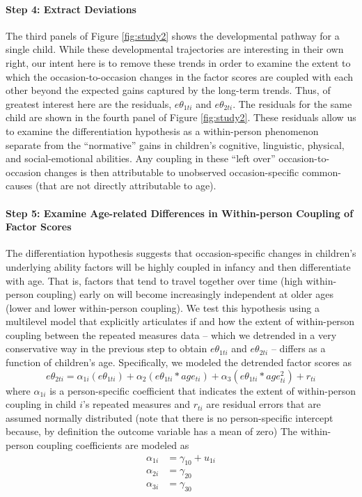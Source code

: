 \documentclass[man, floatsintext]{apa7}
\begin{document}
\paragraph{Step 4: Extract Deviations}
The third panels of Figure \ref{fig:study2} shows the developmental
pathway for a single child. While these developmental trajectories are
interesting in their own right, our intent here is to remove these
trends in order to examine the extent to which the occasion-to-occasion
changes in the factor scores are coupled with each other beyond the
expected gains captured by the long-term trends. Thus, of greatest
interest here are the residuals, $e\theta_{1ti}$ and
$e\theta_{2ti}$. The residuals for the same child are shown in the
fourth panel of Figure \ref{fig:study2}. These residuals allow us to
examine the differentiation hypothesis as a within-person phenomenon
separate from the ``normative'' gains in children's cognitive,
linguistic, physical, and social-emotional abilities. Any coupling in
these ``left over'' occasion-to-occasion changes is then attributable to
unobserved occasion-specific common-causes (that are not directly
attributable to age).

\paragraph{Step 5: Examine Age-related Differences in Within-person
Coupling of Factor
Scores}
The differentiation hypothesis suggests that occasion-specific changes
in children's underlying ability factors will be highly coupled in
infancy and then differentiate with age. That is, factors that
tend to travel together over time (high within-person coupling) early on
will become increasingly independent at older ages (lower and lower
within-person coupling). We test this hypothesis using a multilevel
model that explicitly articulates if and how the extent of within-person
coupling between the repeated measures data -- which we detrended in a
very conservative way in the previous step to obtain $e\theta_{1ti}$
and $e\theta_{2ti}$ -- differs as a function of children's age.
Specifically, we modeled the detrended factor scores as \begin{equation}
e\theta_{2ti} = \alpha_{1i}(e\theta_{1ti}) + \alpha_{2}(e\theta_{1ti} * age_{ti}) + \alpha_{3}(e\theta_{1ti} * age^2_{ti}) + r_{ti}
\end{equation} where $\alpha_{1i}$ is a person-specific coefficient
that indicates the extent of within-person coupling in child $i$'s
repeated measures and $r_{ti}$ are residual errors that are assumed
normally distributed (note that there is no person-specific intercept
because, by definition the outcome variable has a mean of zero) The
within-person coupling coefficients are modeled as
\begin{align}
\alpha_{1i} &= \gamma_{10} + u_{1i} \\
\alpha_{2i} &= \gamma_{20} \\
\alpha_{3i} &= \gamma_{30}
\end{align}
\end{document}
